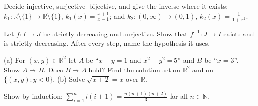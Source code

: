 \documentclass{kaelearn}
\begin{document}
\problem[Variant of Ex. 5] Decide injective, surjective, bijective, and give the inverse where it exists:
$k_1:\mathbb{R}\setminus\{1\}\to\mathbb{R}\setminus\{1\}$, $k_1(x)=\frac{x+1}{x-1}$; and
$k_2:(0,\infty)\to(0,1)$, $k_2(x)=\frac{1}{1+x^2}$.
\answerspace{52mm}

\problem[Variant of Ex. 6] Let $f:I\to J$ be strictly decreasing and surjective. Show that $f^{-1}:J\to I$ exists and is
strictly decreasing. After every step, name the hypothesis it uses.
\answerspace{50mm}

\clearpage
\problem[Variant of Ex. 7] (a) For $(x,y)\in\mathbb{R}^2$ let $A$ be ``$x-y=1$ and $x^2-y^2=5$'' and $B$ be ``$x=3$''.
Show $A\Rightarrow B$. Does $B\Rightarrow A$ hold? Find the solution set on $\mathbb{R}^2$ and on
$\{(x,y): y<0\}$. (b) Solve $\sqrt{x+2}=x$ over $\mathbb{R}$.
\answerspace{78mm}

\problem[Variant of Ex. 8] Show by induction: $\displaystyle\sum_{i=1}^{n}i(i+1)=\frac{n(n+1)(n+2)}{3}$ for all
$n\in\mathbb{N}$.
\answerspace{80mm}
\end{document}
